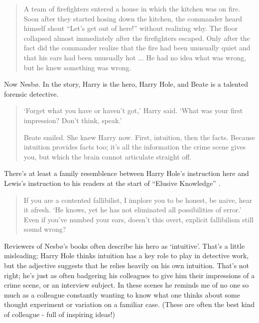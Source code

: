 \begin{quote}
A team of firefighters entered a house in which the kitchen was on fire. Soon after they started hosing down the kitchen, the commander heard himself shout ``Let's get out of here!'' without realizing why. The floor collapsed almost immediately after the firefighters escaped. Only after the fact did the commander realize that the fire had been unusually quiet and that his ears had been unusually hot ... He had no idea what was wrong, but he knew something was wrong. \citep[11]{Kahneman2011}
\end{quote}

\noindent Now Nesb\o. In the story, Harry is the hero, Harry Hole, and Beate is a talented forensic detective.

\begin{quote}
`Forget what you have or haven't got,' Harry said. `What was your first impression? Don't think, speak.'

Beate smiled. She knew Harry now. First, intuition, then the facts. Because intuition provides facts too; it's all the information the crime scene gives you, but which the brain cannot articulate straight off. \citep[126]{Nesbo2009}
\end{quote}

\noindent There's at least a family resemblence between Harry Hole's instruction here and Lewis's instruction to his readers at the start of ``Elusive Knowledge'' \citep{Lewis1996b}.

\begin{quote}
If you are a contented fallibilist, I implore you to be honest, be naive, hear it afresh. `He knows, yet he has not eliminated all possibilities of error.' Even if you've numbed your ears, doesn't this overt, explicit fallibilism still sound wrong? \citep[550]{Lewis1996b}
\end{quote}

\noindent Reviewers of Nesb\o's books often describe his hero as `intuitive'. That's a little misleading; Harry Hole thinks intuition has a key role to play in detective work, but the adjective suggests that he relies heavily on his own intuition. That's not right; he's just as often badgering his colleagues to give him their impressions of a crime scene, or an interview subject. In these scenes he reminds me of no one so much as a colleague constantly wanting to know what one thinks about some thought experiment or variation on a familiar case. (These are often the best kind of colleague - full of inspiring ideas!) 

